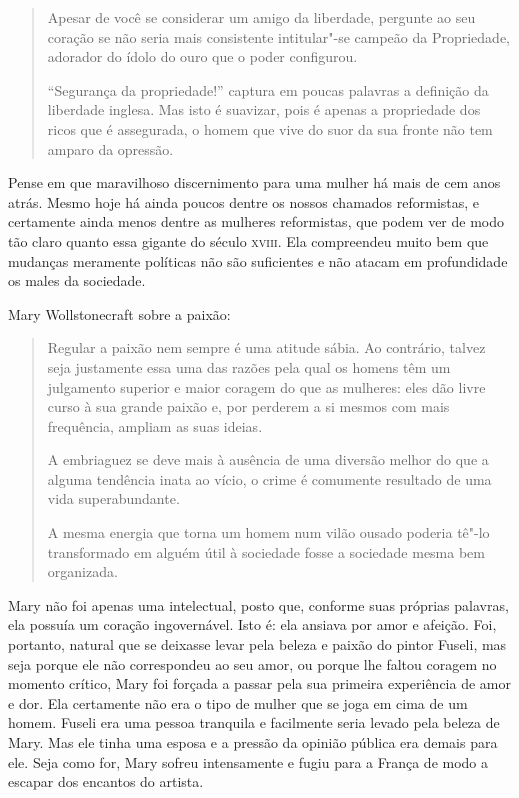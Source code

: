 \begin{quote}
Apesar de você se considerar um amigo da liberdade, pergunte ao seu
coração se não seria mais consistente intitular"-se campeão da
Propriedade, adorador do ídolo do ouro que o poder configurou.

``Segurança da propriedade!'' captura em poucas palavras a definição da
liberdade inglesa. Mas isto é suavizar, pois é apenas a propriedade dos
ricos que é assegurada, o homem que vive do suor da sua fronte não tem
amparo da opressão.
\end{quote}

Pense em que maravilhoso discernimento para uma mulher há mais de cem
anos atrás. Mesmo hoje há ainda poucos dentre os nossos chamados
reformistas, e certamente ainda menos dentre as mulheres reformistas,
que podem ver de modo tão claro quanto essa gigante do século \textsc{xviii}.
Ela compreendeu muito bem que mudanças meramente políticas não são
suficientes e não atacam em profundidade os males da sociedade.

Mary Wollstonecraft sobre a paixão:

\begin{quote}
Regular a paixão nem sempre é uma atitude sábia. Ao contrário, talvez
seja justamente essa uma das razões pela qual os homens têm um
julgamento superior e maior coragem do que as mulheres: eles dão livre
curso à sua grande paixão e, por perderem a si mesmos com mais
frequência, ampliam as suas ideias.\label{regular}

A embriaguez se deve mais à ausência de uma diversão melhor do que a
alguma tendência inata ao vício, o crime é comumente resultado de uma
vida superabundante.

A mesma energia que torna um homem num vilão ousado poderia tê"-lo
transformado em alguém útil à sociedade fosse a sociedade mesma bem
organizada.
\end{quote}

Mary não foi apenas uma intelectual, posto que, conforme suas próprias
palavras, ela possuía um coração ingovernável. Isto é: ela ansiava por
amor e afeição. Foi, portanto, natural que se deixasse levar pela beleza
e paixão do pintor Fuseli, mas seja porque ele não correspondeu ao seu
amor, ou porque lhe faltou coragem no momento crítico, Mary foi forçada
a passar pela sua primeira experiência de amor e dor. Ela certamente não
era o tipo de mulher que se joga em cima de um homem. Fuseli era uma
pessoa tranquila e facilmente seria levado pela beleza de Mary. Mas ele
tinha uma esposa e a pressão da opinião pública era demais para ele.
Seja como for, Mary sofreu intensamente e fugiu para a França de modo a
escapar dos encantos do artista.

